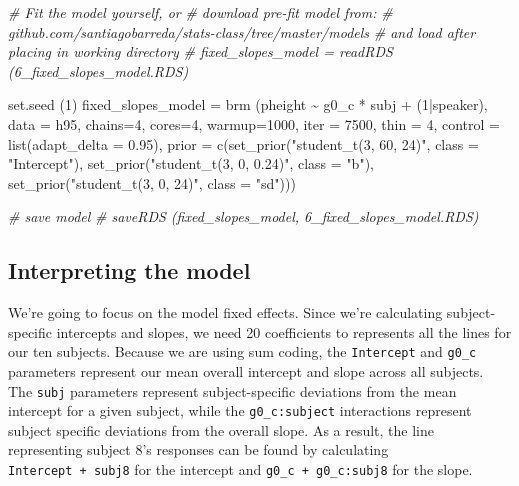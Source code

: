\documentclass[
]{book}
\newenvironment{Shaded}{\begin{snugshade}}{\end{snugshade}}
\newcommand{\AttributeTok}[1]{\textcolor[rgb]{0.77,0.63,0.00}{#1}}
\newcommand{\CommentTok}[1]{\textcolor[rgb]{0.56,0.35,0.01}{\textit{#1}}}
\newcommand{\DecValTok}[1]{\textcolor[rgb]{0.00,0.00,0.81}{#1}}
\newcommand{\FloatTok}[1]{\textcolor[rgb]{0.00,0.00,0.81}{#1}}
\newcommand{\FunctionTok}[1]{\textcolor[rgb]{0.00,0.00,0.00}{#1}}
\newcommand{\NormalTok}[1]{#1}
\newcommand{\OtherTok}[1]{\textcolor[rgb]{0.56,0.35,0.01}{#1}}
\newcommand{\SpecialCharTok}[1]{\textcolor[rgb]{0.00,0.00,0.00}{#1}}
\newcommand{\StringTok}[1]{\textcolor[rgb]{0.31,0.60,0.02}{#1}}
\begin{document}
\begin{Shaded}
\begin{Highlighting}[]
\CommentTok{\# Fit the model yourself, or}
\CommentTok{\# download pre{-}fit model from: }
\CommentTok{\# github.com/santiagobarreda/stats{-}class/tree/master/models}
\CommentTok{\# and load after placing in working directory}
\CommentTok{\# fixed\_slopes\_model = readRDS (\textquotesingle{}6\_fixed\_slopes\_model.RDS\textquotesingle{})}

\FunctionTok{set.seed}\NormalTok{ (}\DecValTok{1}\NormalTok{)}
\NormalTok{fixed\_slopes\_model }\OtherTok{=}
  \FunctionTok{brm}\NormalTok{ (pheight }\SpecialCharTok{\textasciitilde{}}\NormalTok{ g0\_c }\SpecialCharTok{*}\NormalTok{ subj }\SpecialCharTok{+}\NormalTok{ (}\DecValTok{1}\SpecialCharTok{|}\NormalTok{speaker), }\AttributeTok{data =}\NormalTok{ h95, }\AttributeTok{chains=}\DecValTok{4}\NormalTok{, }\AttributeTok{cores=}\DecValTok{4}\NormalTok{,  }
       \AttributeTok{warmup=}\DecValTok{1000}\NormalTok{, }\AttributeTok{iter =} \DecValTok{7500}\NormalTok{, }\AttributeTok{thin =} \DecValTok{4}\NormalTok{, }\AttributeTok{control =} \FunctionTok{list}\NormalTok{(}\AttributeTok{adapt\_delta =} \FloatTok{0.95}\NormalTok{), }
       \AttributeTok{prior =} \FunctionTok{c}\NormalTok{(}\FunctionTok{set\_prior}\NormalTok{(}\StringTok{"student\_t(3, 60, 24)"}\NormalTok{, }\AttributeTok{class =} \StringTok{"Intercept"}\NormalTok{),}
                 \FunctionTok{set\_prior}\NormalTok{(}\StringTok{"student\_t(3, 0, 0.24)"}\NormalTok{, }\AttributeTok{class =} \StringTok{"b"}\NormalTok{),}
                 \FunctionTok{set\_prior}\NormalTok{(}\StringTok{"student\_t(3, 0, 24)"}\NormalTok{, }\AttributeTok{class =} \StringTok{"sd"}\NormalTok{)))}

\CommentTok{\# save model}
\CommentTok{\# saveRDS (fixed\_slopes\_model, \textquotesingle{}6\_fixed\_slopes\_model.RDS\textquotesingle{})}
\end{Highlighting}
\end{Shaded}

\hypertarget{interpreting-the-model-4}{%
\subsection{Interpreting the model}\label{interpreting-the-model-4}}

We're going to focus on the model fixed effects. Since we're calculating subject-specific intercepts and slopes, we need 20 coefficients to represents all the lines for our ten subjects. Because we are using sum coding, the \texttt{Intercept} and \texttt{g0\_c} parameters represent our mean overall intercept and slope across all subjects. The \texttt{subj} parameters represent subject-specific deviations from the mean intercept for a given subject, while the \texttt{g0\_c:subject} interactions represent subject specific deviations from the overall slope. As a result, the line representing subject 8's responses can be found by calculating \texttt{Intercept\ +\ subj8} for the intercept and \texttt{g0\_c\ +\ g0\_c:subj8} for the slope.
\end{document}
